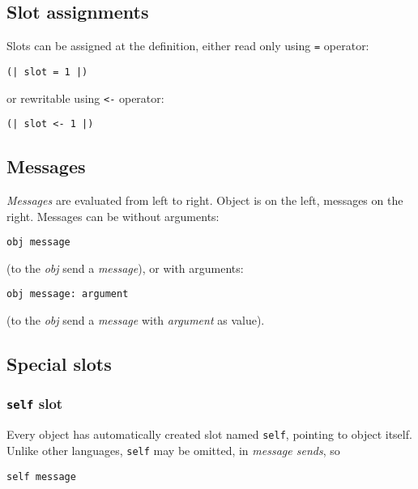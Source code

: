 \documentclass[10pt]{article}
\begin{document}
\begin{multicols*}{3}
\subsection{Slot assignments}

Slots can be assigned at the definition, either read only using \texttt{=} operator:

\begin{lstlisting}
(| slot = 1 |)
\end{lstlisting}

or rewritable using \texttt{<-} operator: %

\begin{lstlisting}
(| slot <- 1 |)
\end{lstlisting}




\subsection{Messages}

\textit{Messages} are evaluated from left to right. Object is on the left, messages on the right. Messages can be without arguments:

\begin{lstlisting}
obj message
\end{lstlisting}

(to the \textit{obj} send a \textit{message}), or with arguments:

\begin{lstlisting}
obj message: argument
\end{lstlisting}

(to the \textit{obj} send a \textit{message} with \textit{argument} as value).




\subsection{Special slots}

\subsubsection{\texttt{self} slot}
Every object has automatically created slot named \texttt{self}, pointing to object itself. Unlike other languages, \texttt{self} may be omitted, in \textit{message sends}, so

\begin{lstlisting}
self message
\end{lstlisting}


\end{multicols*}
\end{document}
